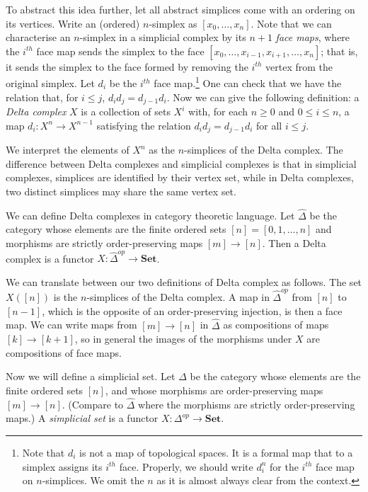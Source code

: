 \documentclass[a4paper,12pt,leqno]{article} \usepackage{amsmath}
\theoremstyle{definition}
\begin{document}
To abstract this idea further, let all abstract simplices come with an ordering
on its vertices.
Write an (ordered) $n$-simplex as $[x_0,\dots,x_n]$.
Note
that we can characterise an $n$-simplex in a simplicial complex by its $n+1$
\emph{face maps}, where the $i^{th}$ face map sends the simplex to the face
$[x_0,\dots, x_{i-1},x_{i+1},\dots, x_n]$; that is, it sends the simplex to the
face formed by removing the $i^{th}$ vertex from the original simplex.
Let
$d_i$ be the $i^{th}$ face map.\footnote{ Note that $d_i$ is not a map of
topological spaces.
It is a formal map that to a simplex assigns its $i^{th}$
face.
Properly, we should write $d_i^n$ for the $i^{th}$ face map on
$n$-simplices.
We omit the $n$ as it is almost always clear from the context.
} One can check that we have the relation that, for $i \leq j$, $d_id_j
= d_{j-1}d_i$.
Now we can give the following definition: a \emph{Delta complex}
$X$ is a collection of sets $X^i$ with, for each $n\geq 0$ and $0\leq i\leq n$,
a map $d_i: X^{n}\to X^{n-1}$ satisfying the relation $d_id_j = d_{j-1}d_i$ for
all $i\leq j$.

We interpret the elements of $X^n$ as the $n$-simplices of the Delta complex.
The difference between Delta complexes and simplicial complexes is that in
simplicial complexes, simplices are identified by their vertex set, while in
Delta complexes, two distinct simplices may share the same vertex set.

We can define Delta complexes in category theoretic language.
Let
$\hat{\Delta}$ be the category whose elements are the finite ordered sets $[n]
= [0,1,\ldots, n]$ and morphisms are strictly order-preserving maps $[m]\to
[n]$.
Then a Delta complex is a functor $X: \hat{\Delta}^{op}\to \textbf{Set}$.

We can translate between our two definitions of Delta complex as follows.
The
set $X([n])$ is the $n$-simplices of the Delta complex.
A map in
$\hat{\Delta}^{op}$ from $[n]$ to $[n-1]$, which is the opposite of an
order-preserving injection, is then a face map.
We can write maps from $[m]\to
[n]$ in $\hat{\Delta}$ as compositions of maps $[k]\to [k+1]$, so in general the
images of the morphisms under $X$ are compositions of face maps.

Now we will define a simplicial set.
Let $\Delta$ be the category whose
elements are the finite ordered sets $[n]$, and whose morphisms are
order-preserving maps $[m]\to [n]$.
(Compare to $\hat{\Delta}$ where the
morphisms are strictly order-preserving maps.) A \emph{simplicial set} is
a functor $X: \Delta^{op}\to \textbf{Set}$.
\end{document}
